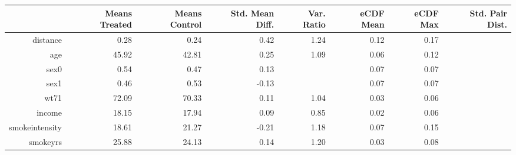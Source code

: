 \begin{table}[ht]
\centering
\begin{tabular}{rrrrrrrr}
  \hline
 & Means Treated & Means Control & Std. Mean Diff. & Var. Ratio & eCDF Mean & eCDF Max & Std. Pair Dist. \\ 
  \hline
distance & 0.28 & 0.24 & 0.42 & 1.24 & 0.12 & 0.17 &  \\ 
  age & 45.92 & 42.81 & 0.25 & 1.09 & 0.06 & 0.12 &  \\ 
  sex0 & 0.54 & 0.47 & 0.13 &  & 0.07 & 0.07 &  \\ 
  sex1 & 0.46 & 0.53 & -0.13 &  & 0.07 & 0.07 &  \\ 
  wt71 & 72.09 & 70.33 & 0.11 & 1.04 & 0.03 & 0.06 &  \\ 
  income & 18.15 & 17.94 & 0.09 & 0.85 & 0.02 & 0.06 &  \\ 
  smokeintensity & 18.61 & 21.27 & -0.21 & 1.18 & 0.07 & 0.15 &  \\ 
  smokeyrs & 25.88 & 24.13 & 0.14 & 1.20 & 0.03 & 0.08 &  \\ 
   \hline
\end{tabular}
\end{table}
